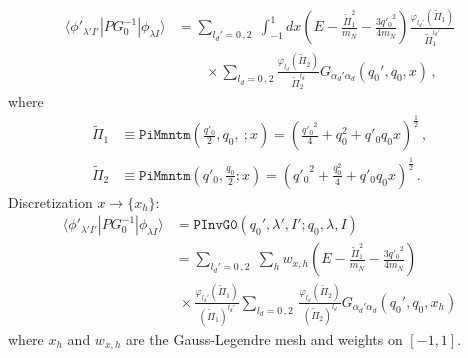 \documentclass[11pt,aps]{revtex4}
\begin{document}
\begin{equation}
\begin{split}
  \langle \phi'_{\lambda' I'} | P G_0^{-1} | \phi_{\lambda I} \rangle &= \sum_{l_d' = 0\, , 2} \;  \int_{-1}^{1} dx \left(E - \frac{\widetilde{\Pi}_1^2}{m_N} - \frac{3 {q'_0}^2}{4m_N} \right) \frac{\varphi_{l_d'}(\widetilde{\Pi}_1)}{\widetilde{\Pi}_1^{l_d'}} \\
  & \qquad \times  \sum_{l_d =0\, , 2} \frac{\varphi_{l_d}(\widetilde{\Pi}_2)}{\widetilde{\Pi}_2^{l_d}} G_{\alpha_d' \alpha_d} (q_0', q_0, x) \, ,
\end{split}
\end{equation}
where
\begin{equation}
\begin{split}
  \widetilde{\Pi}_1 &\equiv \texttt{PiMmntm}\left(\frac{q'_0}{2}, q_0,\ ; x\right) = \left(\frac{{q'_0}^2}{4} + q_0^2 + {q'_0} q_0 x \right)^{\frac{1}{2}} \, ,\\
  \widetilde{\Pi}_2 &\equiv \texttt{PiMmntm}\left(q'_0, \frac{q_0}{2}; x\right) = \left({q'_0}^2 + \frac{q_0^2}{4} + {q'_0} q_0 x \right)^{\frac{1}{2}} \, .
\end{split}
\end{equation}
Discretization $x \to \{x_h\}$:
\begin{equation}
\begin{split}
\langle \phi'_{\lambda' I'} | P G_0^{-1} | \phi_{\lambda I} \rangle  &= \texttt{PInvG0}(q_0', \lambda', I'; q_0, \lambda, I) \\
& =  \sum_{l_d' = 0\, , 2} \; \sum_h w_{x,h} \left(E - \frac{\widetilde{\Pi}_1^2}{m_N} - \frac{3 {q'_0}^2}{4m_N} \right) \\
  & \; \times \frac{\varphi_{l_d'}\left(\widetilde{\Pi}_1\right)}{(\widetilde{\Pi}_1)^{l_d'}} \sum_{l_d =0\, , 2} \, \frac{\varphi_{l_d}\left(\widetilde{\Pi}_2\right)}{(\widetilde{\Pi}_2)^{l_d}}  G_{\alpha_d' \alpha_d} (q_0', q_0, x_h)
\end{split}
\end{equation}
where $x_h$ and $w_{x, h}$ are the Gauss-Legendre mesh and weights on $[-1, 1]$.
\end{document}
